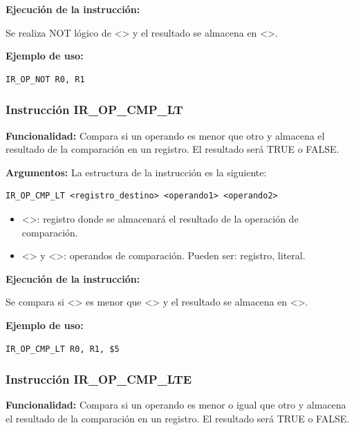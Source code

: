\noindent
\textbf{Ejecución de la instrucción:}
\vspace{0.3cm}

\noindent
Se realiza NOT lógico de <> y el resultado se almacena en <>.
\vspace{0.3cm}

\noindent
\textbf{Ejemplo de uso:}
\begin{verbatim}
IR_OP_NOT R0, R1
\end{verbatim}


\subsubsection{Instrucción IR\_OP\_CMP\_LT}\label{subsubsec:IR_OP_CMP_LT}
\noindent
\textbf{Funcionalidad:} Compara si un operando es menor que otro y almacena el resultado de la comparación en un registro. El resultado será TRUE o FALSE.

\noindent
\textbf{Argumentos:} La estructura de la instrucción es la siguiente:
\begin{verbatim}
IR_OP_CMP_LT <registro_destino> <operando1> <operando2>
\end{verbatim}
\begin{itemize}
    \item <>: registro donde se almacenará el resultado de la operación de comparación.
    \item <> y <>: operandos de comparación. Pueden ser: registro, literal.
\end{itemize}

\noindent
\textbf{Ejecución de la instrucción:}
\vspace{0.3cm}

\noindent
Se compara si <> es menor que <> y el resultado se almacena en <>.
\vspace{0.3cm}

\noindent
\textbf{Ejemplo de uso:}
\begin{verbatim}
IR_OP_CMP_LT R0, R1, $5
\end{verbatim}

\newpage
\subsubsection{Instrucción IR\_OP\_CMP\_LTE}\label{subsubsec:IR_OP_CMP_LTE}
\noindent
\textbf{Funcionalidad:} Compara si un operando es menor o igual que otro y almacena el resultado de la comparación en un registro. El resultado será TRUE o FALSE.

